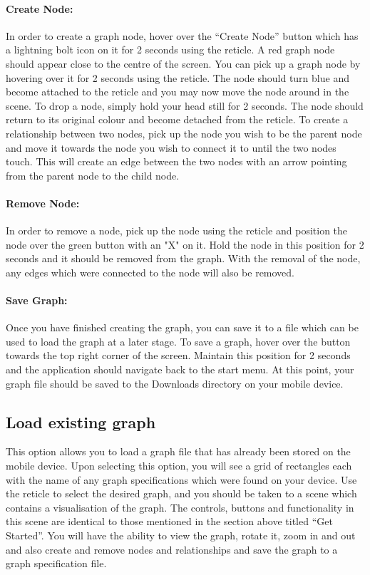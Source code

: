 \documentclass[english]{article}
\begin{document}
\paragraph{Create Node: }
In order to create a graph node, hover over the “Create Node” button which has a lightning bolt icon on it for 2 seconds using the reticle. A red graph node should appear close to the centre of the screen. You can pick up a graph node by hovering over it for 2 seconds using the reticle. The node should turn blue and become attached to the reticle and you may now move the node around in the scene. To drop a node, simply hold your head still for 2 seconds. The node should return to its original colour and become detached from the reticle. To create a relationship between two nodes, pick up the node you wish to be the parent node and move it towards the node you wish to connect it to until the two nodes touch. This will create an edge between the two nodes with an arrow pointing from the parent node to the child node.

\paragraph{Remove Node: }
In order to remove a node, pick up the node using the reticle and position the node over the green button with an "X" on it. Hold the node in this position for 2 seconds and it should be removed from the graph. With the removal of the node, any edges which were connected to the node will also be removed.

\paragraph{Save Graph: }
Once you have finished creating the graph, you can save it to a file which can be used to load the graph at a later stage. To save a graph, hover over the button towards the top right corner of the screen. Maintain this position for 2 seconds and the application should navigate back to the start menu. At this point, your graph file should be saved to the Downloads directory on your mobile device.

\subsection{Load existing graph}
This option allows you to load a graph file that has already been stored on the mobile device. Upon selecting this option, you will see a grid of rectangles each with the name of any graph specifications which were found on your device. Use the reticle to select the desired graph, and you should be taken to a scene which contains a visualisation of the graph. The controls, buttons and functionality in this scene are identical to those mentioned in the section above titled “Get Started”. You will have the ability to view the graph, rotate it, zoom in and out and also create and remove nodes and relationships and save the graph to a graph specification file.
\end{document}
